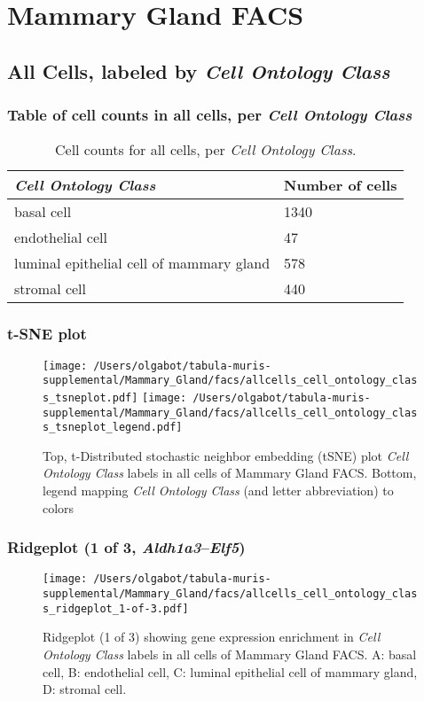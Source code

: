 \clearpage
\section{Mammary Gland FACS}

\subsection{All Cells, labeled by \emph{Cell Ontology Class}}
\subsubsection{Table of cell counts in all cells, per \emph{Cell Ontology Class}}\begin{table}[h]
\centering
\label{my-label}
\begin{tabular}{@{}ll@{}}
\toprule

\emph{Cell Ontology Class}& Number of cells \\ \midrule
basal cell & 1340 \\

endothelial cell & 47 \\

luminal epithelial cell of mammary gland & 578 \\

stromal cell & 440 \\
\bottomrule
\end{tabular}
\caption{Cell counts for all cells, per \emph{Cell Ontology Class}.}
\end{table}

\clearpage
\subsubsection{t-SNE plot}
\begin{figure}[h]
\centering
\texttt{[image: /Users/olgabot/tabula-muris-supplemental/Mammary\_Gland/facs/allcells\_cell\_ontology\_class\_tsneplot.pdf]}
\texttt{[image: /Users/olgabot/tabula-muris-supplemental/Mammary\_Gland/facs/allcells\_cell\_ontology\_class\_tsneplot\_legend.pdf]}
\caption{Top, t-Distributed stochastic neighbor embedding (tSNE) plot  \emph{Cell Ontology Class} labels in all cells of Mammary Gland FACS. Bottom, legend mapping \emph{Cell Ontology Class} (and letter abbreviation) to colors}
\end{figure}


\clearpage

\subsubsection{Ridgeplot (1 of 3, \emph{Aldh1a3}--\emph{Elf5})}
\begin{figure}[h]
\centering
\texttt{[image: /Users/olgabot/tabula-muris-supplemental/Mammary\_Gland/facs/allcells\_cell\_ontology\_class\_ridgeplot\_1-of-3.pdf]}

\caption{ Ridgeplot (1 of 3)  showing gene expression enrichment in \emph{Cell Ontology Class} labels in all cells of Mammary Gland FACS. A: basal cell, B: endothelial cell, C: luminal epithelial cell of mammary gland, D: stromal cell.}
\end{figure}


